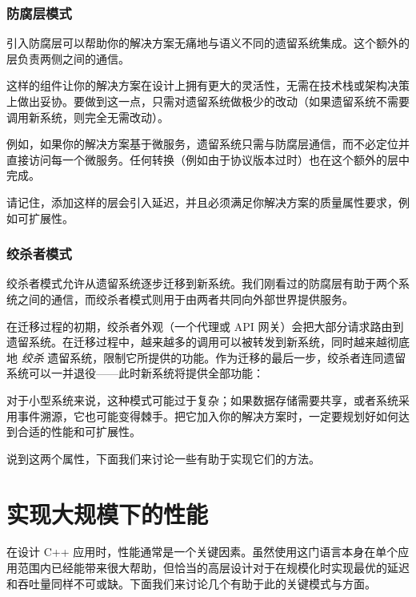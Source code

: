 \subsubsection{防腐层模式}

\label{idx:367}
\label{idx:368}
引入防腐层可以帮助你的解决方案无痛地与语义不同的遗留系统集成。这个额外的层负责两侧之间的通信。

这样的组件让你的解决方案在设计上拥有更大的灵活性，无需在技术栈或架构决策上做出妥协。要做到这一点，只需对遗留系统做极少的改动（如果遗留系统不需要调用新系统，则完全无需改动）。


例如，如果你的解决方案基于微服务，遗留系统只需与防腐层通信，而不必定位并直接访问每一个微服务。任何转换（例如由于协议版本过时）也在这个额外的层中完成。

\label{idx:369}
\label{idx:370}
请记住，添加这样的层会引入延迟，并且必须满足你解决方案的质量属性要求，例如可扩展性。

\subsubsection{绞杀者模式}

\label{idx:371}
绞杀者模式允许从遗留系统逐步迁移到新系统。我们刚看过的防腐层有助于两个系统之间的通信，而绞杀者模式则用于由两者共同向外部世界提供服务。

\label{idx:372}
在迁移过程的初期，绞杀者外观（一个代理或 API 网关）会把大部分请求路由到遗留系统。在迁移过程中，越来越多的调用可以被转发到新系统，同时越来越彻底地 \emph{绞杀} 遗留系统，限制它所提供的功能。作为迁移的最后一步，绞杀者连同遗留系统可以一并退役——此时新系统将提供全部功能：


对于小型系统来说，这种模式可能过于复杂；如果数据存储需要共享，或者系统采用事件溯源，它也可能变得棘手。把它加入你的解决方案时，一定要规划好如何达到合适的性能和可扩展性。

说到这两个属性，下面我们来讨论一些有助于实现它们的方法。

\section{实现大规模下的性能}

在设计 C++ 应用时，性能通常是一个关键因素。虽然使用这门语言本身在单个应用范围内已经能带来很大帮助，但恰当的高层设计对于在规模化时实现最优的延迟和吞吐量同样不可或缺。下面我们来讨论几个有助于此的关键模式与方面。

